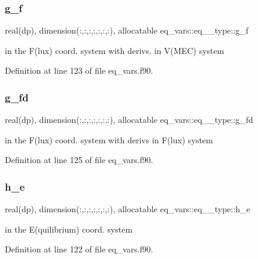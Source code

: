 \subsubsection{\texorpdfstring{g\+\_\+f}{g\_f}}
{\footnotesize\ttfamily real(dp), dimension(\+:,\+:,\+:,\+:,\+:,\+:,\+:), allocatable eq\+\_\+vars\+::eq\+\_\+\_\+type\+::g\+\_\+f}



in the F(lux) coord. system with derivs. in V(\+M\+E\+C) system 



Definition at line 123 of file eq\+\_\+vars.\+f90.

\mbox{\label{structeq__vars_1_1eq__2__type_adaa37b20905a132d62a632ca5a60abf8}} 
\subsubsection{\texorpdfstring{g\+\_\+fd}{g\_fd}}
{\footnotesize\ttfamily real(dp), dimension(\+:,\+:,\+:,\+:,\+:,\+:,\+:), allocatable eq\+\_\+vars\+::eq\+\_\+\_\+type\+::g\+\_\+fd}



in the F(lux) coord. system with derivs in F(lux) system 



Definition at line 125 of file eq\+\_\+vars.\+f90.

\mbox{\label{structeq__vars_1_1eq__2__type_a15446fe9e969815238268794425f6e8c}} 
\subsubsection{\texorpdfstring{h\+\_\+e}{h\_e}}
{\footnotesize\ttfamily real(dp), dimension(\+:,\+:,\+:,\+:,\+:,\+:,\+:), allocatable eq\+\_\+vars\+::eq\+\_\+\_\+type\+::h\+\_\+e}



in the E(quilibrium) coord. system 



Definition at line 122 of file eq\+\_\+vars.\+f90.

